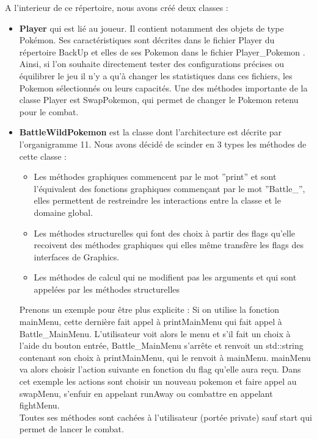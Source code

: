 A l'interieur de ce répertoire, nous avons créé deux classes :
\begin{itemize}
\item \textbf{Player} qui est lié au joueur. Il contient notamment des objets de type Pokémon. Ses caractéristiques sont décrites dans le fichier Player du répertoire BackUp et elles de ses Pokemon dans le fichier Player\_Pokemon . Ainsi, si l'on souhaite directement tester des configurations précises ou équilibrer le jeu il n'y a qu'à changer les statistiques dans ces fichiers, les Pokemon sélectionnés ou leurs capacités. Une des méthodes importante de la classe Player est SwapPokemon, qui permet de changer le Pokemon retenu pour le combat.

\item \textbf{BattleWildPokemon} est la classe dont l'architecture est décrite par l'organigramme 11. Nous avons décidé de scinder en 3 types les méthodes de cette classe :
\begin{itemize}
\item Les méthodes graphiques commencent par le mot ''print'' et sont l'équivalent des fonctions graphiques commençant par le mot ''Battle\_'', elles permettent de restreindre les interactions entre la classe et le domaine global.
\item Les méthodes structurelles qui font des choix à partir des flags qu'elle recoivent des méthodes graphiques qui elles même transfère les flags des interfaces de Graphics. 
\item Les méthodes de calcul qui ne modifient pas les arguments et qui sont appelées par les méthodes structurelles
\end{itemize}
Prenons un exemple pour être plus explicite : Si on utilise la fonction mainMenu, cette dernière fait appel à printMainMenu qui fait appel à Battle\_MainMenu. L'utilisateur voit alors le menu et s'il fait un choix à l'aide du bouton entrée, Battle\_MainMenu s'arrête et renvoit un std::string contenant son choix à printMainMenu, qui le renvoit à mainMenu. mainMenu va alors choisir l'action suivante en fonction du flag qu'elle aura reçu. Dans cet exemple les actions sont choisir un nouveau pokemon et faire appel au swapMenu, s'enfuir en appelant runAway ou combattre en appelant fightMenu.\\

Toutes ses méthodes sont cachées à l'utilisateur (portée private) sauf start qui permet de lancer le combat. 
\end{itemize}
